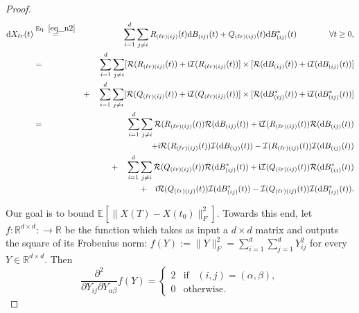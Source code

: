 \documentclass[11pt,letterpaper]{article}
\begin{document}
\begin{proof}
%
\begin{eqnarray}\label{eq_t1}
\mathrm{d}X_{\ell r}(t) &\stackrel{\textrm{Eq. } \eqref{eq_n2}}{=}& \sum_{i=1}^{d} \sum_{j \neq i} R_{(\ell r) (i j)}(t) \mathrm{d}B_{(ij)}(t) + Q_{(\ell r) (i j)}(t) \mathrm{d}B_{(ij)}^\ast(t) \qquad \qquad \forall t \geq 0,\nonumber\\
%
&=& \sum_{i=1}^{d} \sum_{j \neq i} [\mathcal{R}(R_{(\ell r) (i j)}(t)) + \mathfrak{i}  \mathcal{I}(R_{(\ell r) (i j)}(t))] \times  [\mathcal{R}(\mathrm{d}B_{(ij)}(t)) + \mathfrak{i} \mathcal{I}(\mathrm{d}B_{(ij)}(t))]\nonumber\\
%
& & + \quad  \sum_{i=1}^{d} \sum_{j \neq i} [\mathcal{R}(Q_{(\ell r) (i j)}(t)) + \mathfrak{i}  \mathcal{I}(Q_{(\ell r) (i j)}(t))]\times  [\mathcal{R}(\mathrm{d}B_{(ij)}^\ast(t)) + \mathfrak{i} \mathcal{I}(\mathrm{d}B_{(ij)}^\ast(t))]\nonumber\\
%
&=& \sum_{i=1}^{d} \sum_{j \neq i} \mathcal{R}(R_{(\ell r) (i j)}(t))\mathcal{R}(\mathrm{d}B_{(ij)}(t))  + \mathfrak{i}  \mathcal{I}(R_{(\ell r) (i j)}(t)) \mathcal{R}(\mathrm{d}B_{(ij)}(t))\nonumber\\
%
& & \quad + \mathfrak{i}\mathcal{R}(R_{(\ell r) (i j)}(t)) \mathcal{I}(\mathrm{d}B_{(ij)}(t)) - \mathcal{I}(R_{(\ell r) (i j)}(t)) \mathcal{I}(\mathrm{d}B_{(ij)}(t))\nonumber\\
%
& & + \quad \sum_{i=1}^{d} \sum_{j \neq i} \mathcal{R}(Q_{(\ell r) (i j)}(t))\mathcal{R}(\mathrm{d}B_{(ij)}^\ast(t))  + \mathfrak{i}  \mathcal{I}(Q_{(\ell r) (i j)}(t)) \mathcal{R}(\mathrm{d}B_{(ij)}^\ast(t))\nonumber\\
%
& & + \quad \mathfrak{i}\mathcal{R}(Q_{(\ell r) (i j)}(t)) \mathcal{I}(\mathrm{d}B_{(ij)}^\ast(t)) - \mathcal{I}(Q_{(\ell r) (i j)}(t)) \mathcal{I}(\mathrm{d}B_{(ij)}^\ast(t)).
%
%
\end{eqnarray}
%



\noindent
Our goal is to bound $\mathbb{E}[\|X(T) - X(t_0)\|_F^2]$. 
%
Towards this end, let $f: \mathbb{R}^{d \times d}: \rightarrow \mathbb{R}$ be the function which takes as input a $d \times d$ matrix and outputs the square of its Frobenius norm: $f(Y):= \|Y\|_F^2 = \sum_{i=1}^d \sum_{j=1}^d Y_{ij}^2$ for every $Y \in \mathbb{R}^{d\times d}$.
%
Then
\begin{equation}\label{eq_int_5}
%
\frac{\partial^2 }{\partial Y_{ij} \partial Y_{\alpha \beta}}f(Y) =
%
\begin{cases} 
      2 & \textrm{if }  \, \, \, (i,j)= (\alpha, \beta), \\
      0 & \textrm{otherwise}.
   \end{cases}
   \end{equation}


\end{proof}
\end{document}

